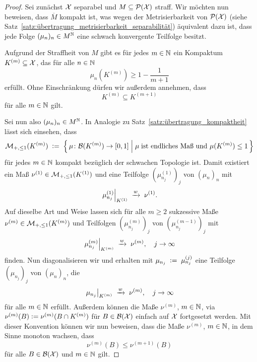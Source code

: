 \documentclass[../thesis/thesis.tex]{subfiles}
\begin{document}
	\begin{proof}
		Sei zunächst $\mathcal{X}$ separabel und $M \subseteq \mathcal{P}(\mathcal{X})$ straff. Wir möchten nun beweisen, dass $\overline{M}$ 
		kompakt ist, was wegen der Metrisierbarkeit von $\mathcal{P}(\mathcal{X})$ (siehe Satz~\ref{satz:übertragung_metrisierbarkeit_separabilität}) äquivalent dazu ist,
		dass jede Folge $(\mu_n)_n \in M^{\mathbb{N}}$ eine schwach konvergente Teilfolge besitzt. 
		
		Aufgrund der Straffheit von $M$ gibt es für jedes $m \in \mathbb{N}$ ein Kompaktum $K^{(m)} \subseteq \mathcal{X}$, 
		das für alle $n \in \mathbb{N}$
		\[ \mu_n(K^{(m)}) \geq 1 - \frac{1}{m+1} \label{glg:5.2} \tag{5.2} \]
		erfüllt. Ohne Einschränkung dürfen wir außerdem annehmen, dass 
		\[ K^{(m)} \subseteq K^{(m+1)} \label{glg:5.3} \tag{5.3} \] 
		für alle $m \in \mathbb{N}$ gilt.
		
		Sei nun also $(\mu_n)_n \in M^{\mathbb{N}}$.
		In Analogie zu Satz~\ref{satz:übertragung_kompaktheit} lässt sich einsehen, dass 
		\[ \mathcal{M}_{+,\leq 1}(K^{(m)}) \; \vcentcolon = \; \left\{\, \mu \colon \mathcal{B}(K^{(m)}) \to [0,1] \; \middle| \; \mu \; 
			\text{ist endliches Maß und } \mu(K^{(m)}) \leq 1 \,\right\} \]
		für jedes $m \in \mathbb{N}$ kompakt bezüglich der schwachen Topologie ist. Damit existiert ein Maß 
		$\nu^{(1)} \in \mathcal{M}_{+,\leq 1}(K^{(1)})$ und eine Teilfolge $(\mu_{n_j}^{(1)})_j$ von $(\mu_n)_n$ mit
		\[ \left.\mu_{n_j}^{(1)}\right|_{K^{(1)}} \; \xrightarrow{w} \; \nu^{(1)} \text{.} \]
		Auf dieselbe Art und Weise lassen sich für alle $m\geq 2$ sukzessive Maße 
		$\nu^{(m)} \in \mathcal{M}_{+,\leq 1}(K^{(m)})$ und Teilfolgen $(\mu_{n_j}^{(m)})_j$ von $(\mu_{n_j}^{(m-1)})_j$ mit
		\[ \left.\mu_{n_j}^{(m)}\right|_{K^{(m)}} \; \xrightarrow{w} \; \nu^{(m)}, \quad j \to \infty \]
		finden.
		Nun diagonalisieren wir und erhalten mit $\mu_{n_j} \; \vcentcolon = \; \mu_{n_j}^{(j)}$ eine Teilfolge 
		$(\mu_{n_j})_j$ von $(\mu_n)_n$, die
		\[ \left.\mu_{n_j}\right|_{K^{(m)}} \; \xrightarrow{w} \; \nu^{(m)}, \quad j \to \infty \]
		für alle $m \in \mathbb{N}$ erfüllt.
		Außerdem können die Maße $\nu^{(m)}$, $m \in \mathbb{N}$, via 
		$\nu^{(m)}(B) \vcentcolon = \nu^{(m)}(B \cap K^{(m)})$ für $B \in \mathcal{B}(\mathcal{X})$ einfach auf $\mathcal{X}$ fortgesetzt werden. 
		Mit dieser Konvention können wir nun beweisen, dass die Maße
		$\nu^{(m)}$, $m \in \mathbb{N}$, in dem Sinne monoton wachsen, dass 
		\[ \nu^{(m)}(B) \leq \nu^{(m+1)}(B) \label{glg:5.4} \tag{5.4} \]
		für alle $B \in \mathcal{B}(\mathcal{X})$ und $m \in \mathbb{N}$ gilt.
		

\end{proof}
\end{document}
